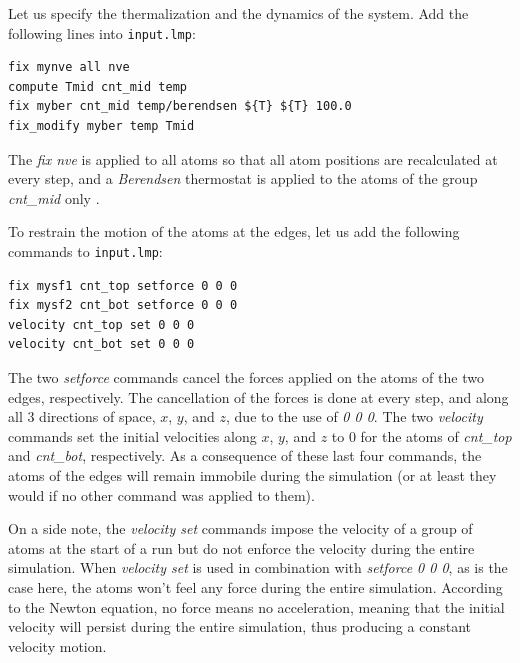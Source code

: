 \documentclass[9pt,tutorial]{livecoms}
\newcommand{\flecmd}[1]{\textcolor{command}{\texttt{#1}}} %
\begin{document}
Let us specify the thermalization and the dynamics of the system. Add the following
lines into \flecmd{input.lmp}:
\begin{lstlisting}
fix mynve all nve
compute Tmid cnt_mid temp
fix myber cnt_mid temp/berendsen ${T} ${T} 100.0
fix_modify myber temp Tmid
\end{lstlisting}
The \textit{fix nve}
is applied to all atoms so that all atom positions are recalculated at every step,
and a \textit{Berendsen} thermostat is applied to the atoms of the group
\textit{cnt\_mid} only \cite{berendsen1984molecular}.
%

To restrain the motion of the atoms at the edges, let us add the following
commands to \flecmd{input.lmp}:
\begin{lstlisting}
fix mysf1 cnt_top setforce 0 0 0
fix mysf2 cnt_bot setforce 0 0 0
velocity cnt_top set 0 0 0
velocity cnt_bot set 0 0 0
\end{lstlisting}
The two \textit{setforce} commands cancel the forces applied on the atoms of the
two edges, respectively. The cancellation of the forces is done at every step,
and along all 3 directions of space, $x$, $y$, and $z$, due to the use of
\textit{0 0 0}. The two \textit{velocity} commands set the initial velocities
along $x$, $y$, and $z$ to 0 for the atoms of \textit{cnt\_top} and
\textit{cnt\_bot}, respectively. As a consequence of these last four commands,
the atoms of the edges will remain immobile during the simulation (or at least
they would if no other command was applied to them).

On a side note, the \textit{velocity set}
commands impose the velocity of a group of atoms at the start of a run but do
not enforce the velocity during the entire simulation. When \textit{velocity set}
is used in combination with \textit{setforce 0 0 0}, as is the case here, the
atoms won't feel any force during the entire simulation. According to the Newton
equation, no force means no acceleration, meaning that the initial velocity
will persist during the entire simulation, thus producing a constant velocity motion.
\end{document}
